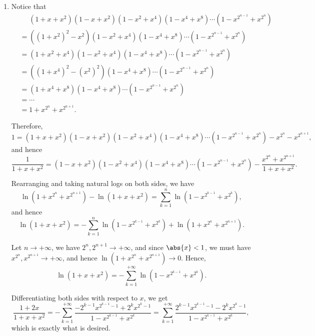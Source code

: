 \begin{enumerate}
    \item Notice that
          \begin{align*}
               & \phantom{=} (1 + x + x^2) (1 - x + x^2) (1 - x^2 + x^4) (1 - x^4 + x^8) \cdots (1 - x^{2^{n - 1}} + x^{2^n}) \\
               & = ((1 + x^2)^2 - x^2) (1 - x^2 + x^4) (1 - x^4 + x^8) \cdots (1 - x^{2^{n - 1}} + x^{2^n})                   \\
               & = (1 + x^2 + x^4) (1 - x^2 + x^4) (1 - x^4 + x^8) \cdots (1 - x^{2^{n - 1}} + x^{2^n})                       \\
               & = ((1 + x^4)^2 - (x^2)^2) (1 - x^4 + x^8) \cdots (1 - x^{2^{n - 1}} + x^{2^n})                               \\
               & = (1 + x^4 + x^8)(1 - x^4 + x^8) \cdots (1 - x^{2^{n - 1}} + x^{2^n})                                        \\
               & = \cdots                                                                                                     \\
               & = 1 + x^{2^n} + x^{2^{n + 1}}.
          \end{align*}

          Therefore,
          \[
              1 = (1 + x + x^2) (1 - x + x^2) (1 - x^2 + x^4) (1 - x^4 + x^8) \cdots (1 - x^{2^{n - 1}} + x^{2^n}) - x^{2^n} - x^{2^{n + 1}},
          \]
          and hence
          \[
              \frac{1}{1 + x + x^2} = (1 - x + x^2) (1 - x^2 + x^4) (1 - x^4 + x^8) \cdots (1 - x^{2^{n - 1}} + x^{2^n}) - \frac{x^{2^n} + x^{2^{n + 1}}}{1 + x + x^2}.
          \]

          Rearranging and taking natural logs on both sides, we have
          \[
              \ln(1 + x^{2^n} + x^{2^{n + 1}}) - \ln (1 + x + x^2) = \sum_{k = 1}^{n} \ln(1 - x^{2^{k - 1}} + x^{2^k}),
          \]
          and hence
          \[
              \ln (1 + x + x^2) = -\sum_{k = 1}^{n} \ln(1 - x^{2^{k - 1}} + x^{2^k}) + \ln(1 + x^{2^n} + x^{2^{n + 1}}).
          \]

          Let \(n \to +\infty\), we have \(2^n, 2^{n + 1} \to +\infty\), and since \(\abs{x} < 1\), we must have \(x^{2^n}, x^{2^{n + 1}} \to +\infty\), and hence \(\ln(1 + x^{2^n} + x^{2^{n + 1}}) \to 0\). Hence,
          \[
              \ln (1 + x + x^2) = - \sum_{k = 1}^{+\infty} \ln(1 - x^{2^{k - 1}} + x^{2^k}).
          \]

          Differentiating both sides with respect to \(x\), we get
          \[
              \frac{1 + 2x}{1 + x + x^2} = - \sum_{k = 1}^{+\infty} \frac{- 2^{k - 1} x^{2^{k - 1} - 1} + 2^{k} x^{2^{k} - 1} }{1 - x^{2^{k - 1}} + x^{2^k}} = \sum_{k = 1}^{+\infty} \frac{2^{k - 1} x^{2^{k - 1} - 1} - 2^{k} x^{2^{k} - 1} }{1 - x^{2^{k - 1}} + x^{2^k}},
          \]
          which is exactly what is desired.
\end{enumerate}